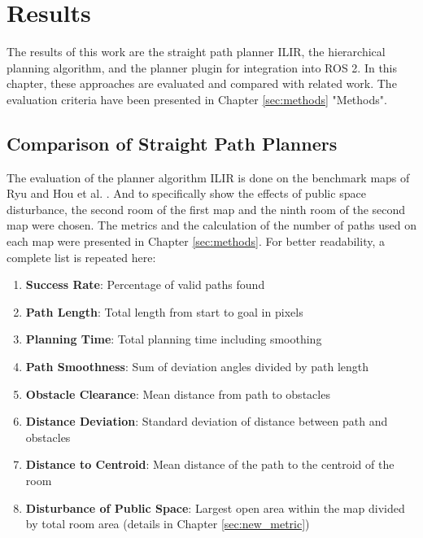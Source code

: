 \chapter{Results}
\label{sec:results}
The results of this work are the straight path planner ILIR, the hierarchical planning algorithm, and the planner plugin for integration into ROS 2. In this chapter, these approaches are evaluated and compared with related work. The evaluation criteria have been presented in Chapter \ref{sec:methods} "Methods".

\section{Comparison of Straight Path Planners}
\label{sec:evaluation_straight_path}
The evaluation of the planner algorithm ILIR is done on the benchmark maps of Ryu \cite{ryu_hierarchical_2020} and Hou et al. \cite{hou_straight_2021}. And to specifically show the effects of public space disturbance, the second room of the first map and the ninth room of the second map were chosen. The metrics and the calculation of the number of paths used on each map were presented in Chapter \ref{sec:methods}. For better readability, a complete list is repeated here:

\begin{enumerate}
    \item \textbf{Success Rate}: Percentage of valid paths found
    \item \textbf{Path Length}: Total length from start to goal in pixels
    \item \textbf{Planning Time}: Total planning time including smoothing
    \item \textbf{Path Smoothness}: Sum of deviation angles divided by path length
    \item \textbf{Obstacle Clearance}: Mean distance from path to obstacles
    \item \textbf{Distance Deviation}: Standard deviation of distance between path and obstacles
    \item \textbf{Distance to Centroid}: Mean distance of the path to the centroid of the room
    \item \textbf{Disturbance of Public Space}: Largest open area within the map divided by total room area (details in Chapter \ref{sec:new_metric})
\end{enumerate}

